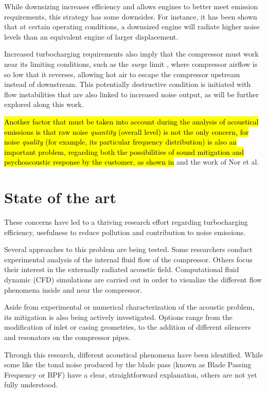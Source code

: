 While downsizing increases efficiency and allows engines to better meet emission requirements, this strategy has some downsides. For instance, it has been shown \cite{stoffels2003nvh} that at certain operating conditions, a downsized engine will radiate higher noise levels than an equivalent engine of larger displacement.

Increased turbocharging requirements also imply that the compressor must work near its limiting conditions, such as the \emph{surge} limit \cite{teng2009investigation}, where compressor airflow is so low that it reverses, allowing hot air to escape the compressor upstream instead of downstream. This potentially destructive condition is initiated with flow instabilities that are also linked to increased noise output, as will be further explored along this work.

\hl{Another factor that must be taken into account during the analysis of acoustical emissions is that raw noise \emph{quantity} (overall level) is not the only concern, for noise \emph{quality} (for example, its particular frequency distribution) is also an important problem, regarding both the possibilities of sound  mitigation and psychoacoustic response by the customer, as shown in} \cite{brizon2012combining} and the work of Nor et al. \cite{nor2008index}

\section{State of the art}

These concerns have led to a thriving research effort regarding turbocharging efficiency, usefulness to reduce pollution and contribution to noise emissions.

Several approaches to this problem are being tested. Some researchers conduct experimental analysis of the internal fluid flow of the compressor. Others focus their interest in the externally radiated acoustic field. Computational fluid dynamic (CFD) simulations are carried out in order to visualize the different flow phenomena inside and near the compressor.

Aside from experimental or numerical characterization of the acoustic problem, its mitigation is also being actively investigated. Options range from the modification of inlet or casing geometries, to the addition of different silencers and resonators on the compressor pipes.

Through this research, different acoustical phenomena have been identified. While some like the tonal noise produced by the blade pass (known as Blade Passing Frequency or BPF) have a clear, straightforward explanation, others are not yet fully understood.

